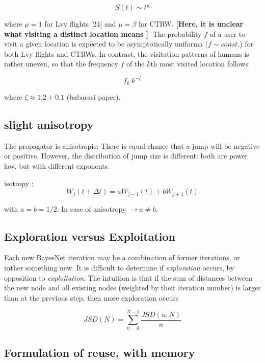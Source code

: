 \begin{equation}
S(t) \sim t^{\mu}
\end{equation}


where $\mu = 1$ for Lvy flights [24] and $\mu = \beta$ for CTRW. {\bf [Here, it is unclear what visiting a distinct location means ]}
The probability $f$ of a user to visit a given location is expected to be asymptotically uniforma ($f\sim const.$) for both Lvy flights and CTRWs. In contrast, the visitation patterns of humans is rather uneven, so that the frequency $f$ of the $k$th  most visited location follows

\begin{equation}
f_k ~k^{-\zeta}
\end{equation}

where $\zeta \approx 1.2 \pm 0.1$ (babarasi paper).


\subsection{slight anisotropy}
The propagator is anisotropic: There is equal chance that a jump will be negative or positive. However, the distribution of jump size is different: both are power law, but with different exponents.

isotropy :
\begin{equation}
W_j (t+\Delta t) = a W_{j-1}(t) + b W_{j+1}(t)
\end{equation}

with $a=b=1/2$. In case of anisotropy $\rightarrow  a \neq b$.



\subsection{Exploration versus Exploitation}
Each new BayesNet iteration may be a combination of former iterations, or rather something new. It is difficult to determine if {\it exploration} occurs, by opposition to {\it exploitation}. The intuition is that if the sum of distances between the new node and all existing nodes (weighted by their iteration number) is larger than at the previous step, then more exploration occurs

\begin{equation}
\overline{JSD}(N) =  \sum_{n=0}^{N-1} \frac{JSD(n,N)}{n}
\end{equation}



\subsection{Formulation of reuse, with memory}
